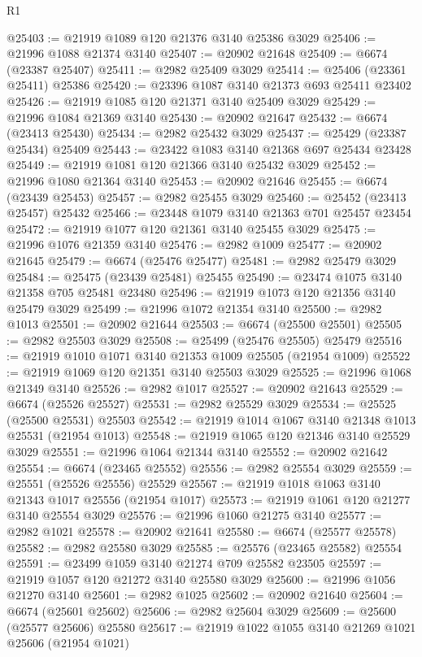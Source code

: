 \begin{lexlean}{R1}
\begin{coremodule}
@25403 := @21919 @1089 @120 @21376 @3140 @25386 @3029
@25406 := @21996 @1088 @21374 @3140
@25407 := @20902 @21648
@25409 := @6674 (@23387 @25407)
@25411 := @2982 @25409 @3029
@25414 := @25406 (@23361 @25411) @25386
@25420 := @23396 @1087 @3140 @21373 @693 @25411 @23402
@25426 := @21919 @1085 @120 @21371 @3140 @25409 @3029
@25429 := @21996 @1084 @21369 @3140
@25430 := @20902 @21647
@25432 := @6674 (@23413 @25430)
@25434 := @2982 @25432 @3029
@25437 := @25429 (@23387 @25434) @25409
@25443 := @23422 @1083 @3140 @21368 @697 @25434 @23428
@25449 := @21919 @1081 @120 @21366 @3140 @25432 @3029
@25452 := @21996 @1080 @21364 @3140
@25453 := @20902 @21646
@25455 := @6674 (@23439 @25453)
@25457 := @2982 @25455 @3029
@25460 := @25452 (@23413 @25457) @25432
@25466 := @23448 @1079 @3140 @21363 @701 @25457 @23454
@25472 := @21919 @1077 @120 @21361 @3140 @25455 @3029
@25475 := @21996 @1076 @21359 @3140
@25476 := @2982 @1009
@25477 := @20902 @21645
@25479 := @6674 (@25476 @25477)
@25481 := @2982 @25479 @3029
@25484 := @25475 (@23439 @25481) @25455
@25490 := @23474 @1075 @3140 @21358 @705 @25481 @23480
@25496 := @21919 @1073 @120 @21356 @3140 @25479 @3029
@25499 := @21996 @1072 @21354 @3140
@25500 := @2982 @1013
@25501 := @20902 @21644
@25503 := @6674 (@25500 @25501)
@25505 := @2982 @25503 @3029
@25508 := @25499 (@25476 @25505) @25479
@25516 := @21919 @1010 @1071 @3140 @21353 @1009 @25505 (@21954 @1009)
@25522 := @21919 @1069 @120 @21351 @3140 @25503 @3029
@25525 := @21996 @1068 @21349 @3140
@25526 := @2982 @1017
@25527 := @20902 @21643
@25529 := @6674 (@25526 @25527)
@25531 := @2982 @25529 @3029
@25534 := @25525 (@25500 @25531) @25503
@25542 := @21919 @1014 @1067 @3140 @21348 @1013 @25531 (@21954 @1013)
@25548 := @21919 @1065 @120 @21346 @3140 @25529 @3029
@25551 := @21996 @1064 @21344 @3140
@25552 := @20902 @21642
@25554 := @6674 (@23465 @25552)
@25556 := @2982 @25554 @3029
@25559 := @25551 (@25526 @25556) @25529
@25567 := @21919 @1018 @1063 @3140 @21343 @1017 @25556 (@21954 @1017)
@25573 := @21919 @1061 @120 @21277 @3140 @25554 @3029
@25576 := @21996 @1060 @21275 @3140
@25577 := @2982 @1021
@25578 := @20902 @21641
@25580 := @6674 (@25577 @25578)
@25582 := @2982 @25580 @3029
@25585 := @25576 (@23465 @25582) @25554
@25591 := @23499 @1059 @3140 @21274 @709 @25582 @23505
@25597 := @21919 @1057 @120 @21272 @3140 @25580 @3029
@25600 := @21996 @1056 @21270 @3140
@25601 := @2982 @1025
@25602 := @20902 @21640
@25604 := @6674 (@25601 @25602)
@25606 := @2982 @25604 @3029
@25609 := @25600 (@25577 @25606) @25580
@25617 := @21919 @1022 @1055 @3140 @21269 @1021 @25606 (@21954 @1021)

\end{coremodule}
\end{lexlean}
